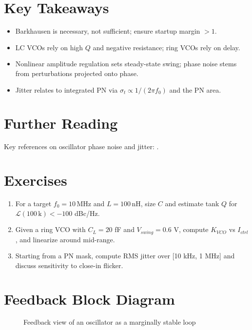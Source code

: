 \section{Key Takeaways}
\begin{itemize}
  \item Barkhausen is necessary, not sufficient; ensure startup margin $>1$.
  \item LC VCOs rely on high $Q$ and negative resistance; ring VCOs rely on delay.
  \item Nonlinear amplitude regulation sets steady-state swing; phase noise stems from perturbations projected onto phase.
  \item Jitter relates to integrated PN via $\sigma_t \propto 1/(2\pi f_0)$ and the PN area.
\end{itemize}

\section{Further Reading}
Key references on oscillator phase noise and jitter: \cite{leeson1966,hajimiri1998,demir2000}.

\section{Exercises}
\begin{enumerate}
  \item For a target $f_0=10\,\text{MHz}$ and $L=100\,\text{nH}$, size $C$ and estimate tank $Q$ for $\mathcal{L}(100\,\text{k})<-100$ dBc/Hz.
  \item Given a ring VCO with $C_L=20$ fF and $V_{swing}=0.6$ V, compute $K_{VCO}$ vs $I_{ctrl}$, and linearize around mid-range.
  \item Starting from a PN mask, compute RMS jitter over [10 kHz, 1 MHz] and discuss sensitivity to close-in flicker.
\end{enumerate}

\section{Feedback Block Diagram}
\begin{figure}[H]
  \centering
  \caption{Feedback view of an oscillator as a marginally stable loop}
\end{figure}


